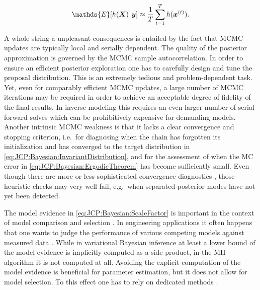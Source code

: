\begin{equation} \label{eq:JCP:Bayesian:ErgodicTheorem}
  \mathds{E}[h(\bm{X}) \cond \bm{y}] \approx \frac{1}{T} \sum\limits_{t=1}^T h(\bm{x}^{(t)}).
\end{equation}
\par %
A whole string a unpleasant consequences is entailed by the fact that MCMC updates are typically local and serially dependent.
The quality of the posterior approximation is governed by the MCMC sample autocorrelation.
In order to ensure an efficient posterior exploration one has to carefully design and tune the proposal distribution.
This is an extremely tedious and problem-dependent task.
Yet, even for comparably efficient MCMC updates, a large number of MCMC iterations may be required in order to achieve an acceptable degree of fidelity of the final results.
In inverse modeling this requires an even larger number of serial forward solves which can be prohibitively expensive for demanding models.
Another intrinsic MCMC weakness is that it lacks a clear convergence and stopping criterion,
i.e.\ for diagnosing when the chain has forgotten its initialization and has converged to the target distribution in \cref{eq:JCP:Bayesian:InvariantDistribution},
and for the assessment of when the MC error in \cref{eq:JCP:Bayesian:ErgodicTheorem} has become sufficiently small.
Even though there are more or less sophisticated convergence diagnostics \cite{MCMC:Cowles1996,MCMC:Brooks1998:Roberts},
those heuristic checks may very well fail, e.g.\ when separated posterior modes have not yet been detected.
\par %
The model evidence in \cref{eq:JCP:Bayesian:ScaleFactor} is important in the context of model comparison and selection \cite{Bayesian:Vehtari2012}.
In engineering applications it often happens that one wants to judge the performance of various competing models against measured data \cite{Bayesian:Beck2004,Bayesian:Yuen2010:b}.
While in variational Bayesian inference at least a lower bound of the model evidence is implicitly computed as a side product, in the MH algorithm it is not computed at all.
Avoiding the explicit computation of the model evidence is beneficial for parameter estimation, but it does not allow for model selection.
To this effect one has to rely on dedicated methods \cite{Bayesian:Han2001,Bayesian:Dellaportas2002}.